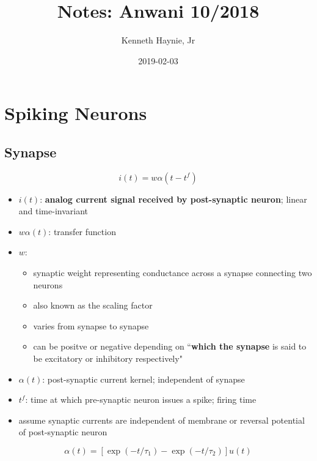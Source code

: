 \documentclass{article}
\title{Notes: Anwani 10/2018}
\date{2019-02-03}
\author{Kenneth Haynie, Jr}
\begin{document}
    \maketitle
    \setcounter{section}{2}
        \section{Spiking Neurons}
            \subsection{Synapse}
                \begin{equation}
                    i(t) = w \alpha(t-t^f)
                \end{equation}
                \begin{itemize}
                    \item $i(t)$: \textbf{analog current signal received by
                    post-synaptic neuron}; linear and time-invariant
                    \item $w\alpha(t)$: transfer function
                    \item $w$: 
                    \begin{itemize}
                        \item synaptic weight representing conductance across
                        a synapse connecting two neurons
                        \item also known as the scaling factor
                        \item varies from synapse to synapse
                        \item can be positve or negative depending on ``\textbf{which
                            the synapse} is said to be excitatory or inhibitory
                        respectively"
                    \end{itemize}
                    \item $\alpha(t)$: post-synaptic current kernel;
                    independent of synapse
                    \item $t^f$: time at which pre-synaptic neuron issues a
                    spike; firing time
                    \item assume synaptic currents are independent of membrane or reversal
                    potential of post-synaptic neuron
                \end{itemize}
                \hfill\break
                \begin{equation}
                    \alpha(t)=[\exp(-t/\tau_1)-\exp(-t/\tau_2)]u(t)
                \end{equation}
\end{document}
